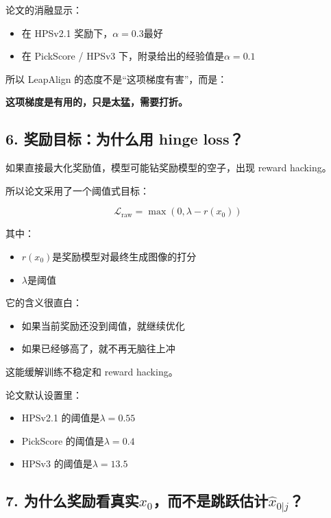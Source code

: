 论文的消融显示：

\begin{itemize}[leftmargin=1.5em]
  \item 在 HPSv2.1 奖励下，$\alpha = 0.3$最好
  \item 在 PickScore / HPSv3 下，附录给出的经验值是$\alpha = 0.1$
\end{itemize}

所以 LeapAlign 的态度不是“这项梯度有害”，而是：

\textbf{这项梯度是有用的，只是太猛，需要打折。}

\subsection{6. 奖励目标：为什么用 hinge loss？}

如果直接最大化奖励值，模型可能钻奖励模型的空子，出现 reward hacking。

所以论文采用了一个阈值式目标：

\[
\mathcal{L}_{\mathrm{raw}}
=
\max(0, \lambda - r(x_0))
\]

其中：

\begin{itemize}[leftmargin=1.5em]
  \item $r(x_0)$是奖励模型对最终生成图像的打分
  \item $\lambda$是阈值
\end{itemize}

它的含义很直白：

\begin{itemize}[leftmargin=1.5em]
  \item 如果当前奖励还没到阈值，就继续优化
  \item 如果已经够高了，就不再无脑往上冲
\end{itemize}

这能缓解训练不稳定和 reward hacking。

论文默认设置里：

\begin{itemize}[leftmargin=1.5em]
  \item HPSv2.1 的阈值是$\lambda = 0.55$
  \item PickScore 的阈值是$\lambda = 0.4$
  \item HPSv3 的阈值是$\lambda = 13.5$
\end{itemize}

\subsection{7. 为什么奖励看真实$x_0$，而不是跳跃估计$\hat{x}_{0|j}$？}

